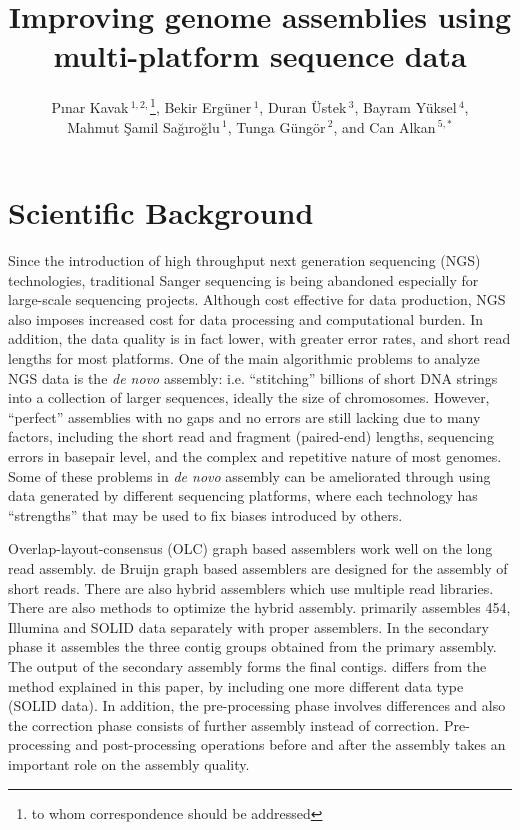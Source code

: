 \documentclass[12pt,a4paper]{cibb}
\title{\large $\ $\\ \bf Improving genome assemblies using multi-platform sequence data}
\author{ P\i nar Kavak\,$^{1,2,}$\footnote{to whom correspondence should be addressed},  Bekir Erg\"{u}ner\,$^{1}$,  Duran \"{U}stek\,$^{3}$,  Bayram Y\"{u}ksel\,$^{4}$, \\
  Mahmut \c{S}amil Sa\u{g}\i ro\u{g}lu\,$^1$, 
  Tunga G\"{u}ng\"{o}r\,$^{2}$, and 
  Can Alkan\,$^{5,*}$}
\begin{document}
\thispagestyle{myheadings}
\pagestyle{myheadings}

\section{\bf Scientific Background}

Since the introduction of high throughput next generation sequencing (NGS) technologies, traditional Sanger sequencing is being abandoned especially for large-scale sequencing projects.
Although cost effective for data production, NGS also imposes increased cost for data processing and computational burden. 
In addition, the data quality is in fact lower, with greater error rates, and short read lengths for most platforms. 
One of the main algorithmic problems to analyze NGS data is the \textit{de novo} assembly: i.e. ``stitching'' billions of short DNA strings into a collection of larger sequences, ideally the size of chromosomes. 
However, ``perfect'' assemblies with no gaps and no errors are still lacking due to many factors, including the short read and fragment (paired-end) lengths, sequencing errors in basepair level, and the complex and repetitive nature of most genomes. 
Some of these problems in \textit{de novo} assembly can be ameliorated through using data generated by different sequencing platforms, where each technology has ``strengths'' that may be used to fix biases introduced by others.

Overlap-layout-consensus (OLC) graph based assemblers \cite{celera:2000, sga:2012} work well on the long read assembly. de Bruijn graph based assemblers \cite{velvetZerbino:2008, spadesBankevich:2012, allpaths:2008} are designed for the assembly of short reads. 
There are also hybrid assemblers \cite{cabogMiller:2008, masurcaZimin:2013, mira} which use multiple read libraries. 
There are also methods \cite{wang:2012} to optimize the hybrid assembly. 
\cite{wang:2012} primarily assembles 454, Illumina and SOLID data separately with proper assemblers. 
In the secondary phase it assembles the three contig groups obtained from the primary assembly. The output of the secondary assembly forms the final contigs. 
\cite{wang:2012} differs from the method explained in this paper, by including one more different data type (SOLID data). In addition, the pre-processing phase involves differences and also the correction phase consists of further assembly instead of correction.
Pre-processing and post-processing operations before and after the assembly takes an important role on the assembly quality.
\end{document}
